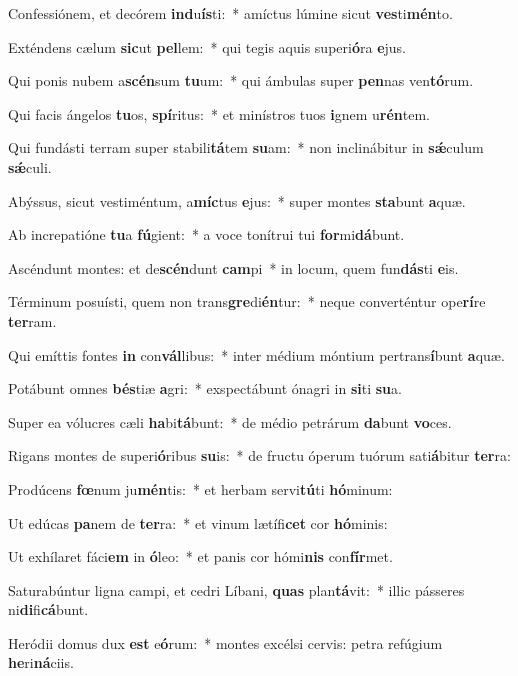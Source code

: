 \item Confessiónem, et decórem \textbf{ind}u\textbf{ís}ti:~* amíctus lúmine sicut \textbf{ves}ti\textbf{mén}to.
\item Exténdens cælum \textbf{sic}ut \textbf{pel}lem:~* qui tegis aquis superi\textbf{ó}ra \textbf{e}jus.
\item Qui ponis nubem a\textbf{scén}sum \textbf{tu}um:~* qui ámbulas super \textbf{pen}nas ven\textbf{tó}rum.
\item Qui facis ángelos \textbf{tu}os, \textbf{spí}ritus:~* et minístros tuos \textbf{i}gnem u\textbf{rén}tem.
\item Qui fundásti terram super stabili\textbf{tá}tem \textbf{su}am:~* non inclinábitur in \textbf{sǽ}culum \textbf{sǽ}culi.
\item Abýssus, sicut vestiméntum, a\textbf{míc}tus \textbf{e}jus:~* super montes \textbf{sta}bunt \textbf{a}quæ.
\item Ab increpatióne \textbf{tu}a \textbf{fú}gient:~* a voce tonítrui tui \textbf{for}mi\textbf{dá}bunt.
\item Ascéndunt montes: et de\textbf{scén}dunt \textbf{cam}pi~* in locum, quem fun\textbf{dás}ti \textbf{e}is.
\item Términum posuísti, quem non trans\textbf{gre}di\textbf{én}tur:~* neque converténtur ope\textbf{rí}re \textbf{ter}ram.
\item Qui emíttis fontes \textbf{in} con\textbf{vál}libus:~* inter médium móntium pertrans\textbf{í}bunt \textbf{a}quæ.
\item Potábunt omnes \textbf{bés}tiæ \textbf{a}gri:~* exspectábunt ónagri in \textbf{si}ti \textbf{su}a.
\item Super ea vólucres cæli \textbf{ha}bi\textbf{tá}bunt:~* de médio petrárum \textbf{da}bunt \textbf{vo}ces.
\item Rigans montes de superi\textbf{ó}ribus \textbf{su}is:~* de fructu óperum tuórum sati\textbf{á}bitur \textbf{ter}ra:
\item Prodúcens \textbf{fœ}num ju\textbf{mén}tis:~* et herbam servi\textbf{tú}ti \textbf{hó}minum:
\item Ut edúcas \textbf{pa}nem de \textbf{ter}ra:~* et vinum lætífi\textbf{cet} cor \textbf{hó}minis:
\item Ut exhílaret fáci\textbf{em} in \textbf{ó}leo:~* et panis cor hómi\textbf{nis} con\textbf{fír}met.
\item Saturabúntur ligna campi, et cedri Líbani, \textbf{quas} plan\textbf{tá}vit:~* illic pásseres ni\textbf{di}fi\textbf{cá}bunt.
\item Heródii domus dux \textbf{est} e\textbf{ó}rum:~* montes excélsi cervis: petra refúgium \textbf{he}ri\textbf{ná}ciis.
